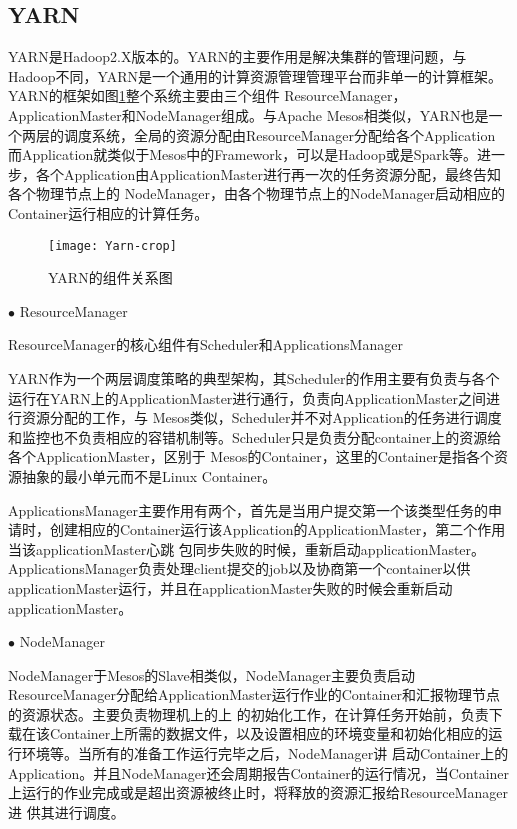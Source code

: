 \subsection{YARN}

YARN是Hadoop2.X版本的。YARN的主要作用是解决集群的管理问题，与Hadoop不同，YARN是一个通用的计算资源管理管理平台而非单一的计算框架。YARN的框架如图\ref{fig:Yarn}整个系统主要由三个组件
ResourceManager，ApplicationMaster和NodeManager组成。与Apache Mesos相类似，YARN也是一个两层的调度系统，全局的资源分配由ResourceManager分配给各个Application
而Application就类似于Mesos中的Framework，可以是Hadoop或是Spark等。进一步，各个Application由ApplicationMaster进行再一次的任务资源分配，最终告知各个物理节点上的
NodeManager，由各个物理节点上的NodeManager启动相应的Container运行相应的计算任务。
\begin{figure}[htbp]
\centering\texttt{[image: Yarn-crop]}
\caption{YARN的组件关系图}\label{fig:Yarn}
\end{figure}

$\bullet$ ResourceManager

ResourceManager的核心组件有Scheduler和ApplicationsManager

YARN作为一个两层调度策略的典型架构，其Scheduler的作用主要有负责与各个运行在YARN上的ApplicationMaster进行通行，负责向ApplicationMaster之间进行资源分配的工作，与
Mesos类似，Scheduler并不对Application的任务进行调度和监控也不负责相应的容错机制等。Scheduler只是负责分配container上的资源给各个ApplicationMaster，区别于
Mesos的Container，这里的Container是指各个资源抽象的最小单元而不是Linux Container。

ApplicationsManager主要作用有两个，首先是当用户提交第一个该类型任务的申请时，创建相应的Container运行该Application的ApplicationMaster，第二个作用当该applicationMaster心跳
包同步失败的时候，重新启动applicationMaster。
ApplicationsManager负责处理client提交的job以及协商第一个container以供applicationMaster运行，并且在applicationMaster失败的时候会重新启动applicationMaster。

$\bullet$ NodeManager

NodeManager于Mesos的Slave相类似，NodeManager主要负责启动ResourceManager分配给ApplicationMaster运行作业的Container和汇报物理节点的资源状态。主要负责物理机上的上
的初始化工作，在计算任务开始前，负责下载在该Container上所需的数据文件，以及设置相应的环境变量和初始化相应的运行环境等。当所有的准备工作运行完毕之后，NodeManager讲
启动Container上的Application。并且NodeManager还会周期报告Container的运行情况，当Container上运行的作业完成或是超出资源被终止时，将释放的资源汇报给ResourceManager进
供其进行调度。

